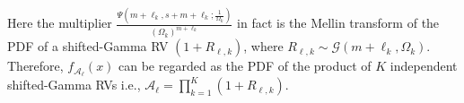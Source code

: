 \documentclass[12pt,onecolumn,draftcls]{IEEEtran}
\newcommand{\bs}{\boldsymbol}
\begin{document}
Here the multiplier ${\frac{{\Psi \left( {m + {\ell_k},s + m + {\ell_k};\frac{1}{{{\Omega _k}}}} \right)}}{{{{\left( {{\Omega _k}} \right)}^{m + {\ell_k}}}}}}$ in fact is the Mellin transform of the PDF of a shifted-Gamma RV $(1+R_{{\bs{\ell}},k})$, where $R_{{\bs{\ell}},k} \sim \mathcal {G}(m+\ell_k,{\Omega _k})$. Therefore, ${f_{{{ {\mathcal A}}_{\bs{\ell}}}}}(x)$ can be regarded as the PDF of the product of $K$ independent shifted-Gamma RVs i.e., $\mathcal A_{\bs{\ell}} = \prod\nolimits_{k = 1}^K (1+R_{{\bs{\ell}},k})$.
%
\end{document}
